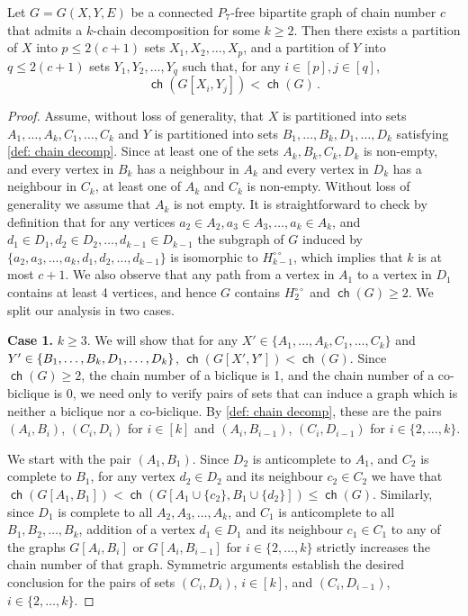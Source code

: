 \documentclass{article}
\newcommand\splitaftercomma[1]{%
  \begingroup
  \begingroup\lccode`~=`, \lowercase{\endgroup
    \edef~{\mathchar\the\mathcode`, \penalty0 \noexpand\hspace{0pt plus .25em}}%
  }\mathcode`,="8000 #1%
  \endgroup
}
\DeclareMathOperator\ch{\mathsf{ch}}
\begin{document}
\begin{lemma}
	\label{lemma: P7 decomp G}
	Let $G=G(X,Y,E)$ be a connected $P_7$-free bipartite graph of chain number $c$ that
	admits a $k$-chain decomposition for some $k \geq 2$. Then there exists 
	a partition of $X$ into $p \leq 2(c+1)$ sets $X_1, X_2, \ldots, X_p$, and
	a partition of $Y$ into $q \leq 2(c+1)$ sets $Y_1, Y_2, \ldots, Y_q$ such that, for any $i
  \in [p], j \in [q]$,
	\[
	\ch(G[X_i, Y_j]) <  \ch(G) \,.
	\]
\end{lemma}
\begin{proof}
	Assume, without loss of generality, that $X$ is partitioned into sets $A_1, \ldots, A_k, C_1, \ldots, C_k$ and $Y$ is partitioned into sets $B_1, \ldots, B_k, D_1, \ldots, D_k$ satisfying \cref{def: chain decomp}.
	Since at least one of the sets $A_k, B_k,C_k,D_k$ is non-empty, and
	every vertex in $B_k$ has a neighbour in $A_k$ and every vertex in $D_k$ has a neighbour in $C_k$,
	at least one of $A_k$ and $C_k$ is non-empty. Without loss of generality we assume that $A_k$ is not empty.
	It is straightforward to check by definition that for any vertices $a_2 \in A_2, a_3 \in A_3, \ldots, a_k \in A_k$,
	and $d_1 \in D_1, d_2 \in D_2, \ldots, d_{k-1} \in D_{k-1}$ the subgraph of $G$ induced by 
	$\{ a_2, a_3, \ldots, a_k, d_1, d_2, \ldots, d_{k-1} \}$ is isomorphic to $H^{\circ\circ}_{k-1}$, which implies that $k$ is at most $c+1$.
	We also observe that any path from a vertex in $A_1$ to a vertex in $D_1$
	contains at least 4 vertices, and hence $G$ contains $H^{\circ\circ}_2$ and 
	$\ch(G) \geq 2$. We split our analysis in two cases.
	
	\textbf{Case 1.} $k \geq 3$. We will show that for any 
	$X' \in \{ A_1, \ldots, A_k, C_1, \ldots, C_k \}$ and $Y' \in \{ B_1, \ldots, B_k\splitaftercomma{,} D_1, \ldots, D_k \}$,
	$\ch(G[X',Y']) < \ch(G)$. Since $\ch(G) \geq 2$, the chain number of a biclique is 1, and the chain number of a co-biclique is 0, we need only to verify pairs of sets that can induce a graph which is neither a biclique nor a co-biclique. By \cref{def: chain decomp}, these are the pairs 
	$(A_i, B_i)$, $(C_i, D_i)$  for $i \in [k]$ and $(A_i, B_{i-1})$, $(C_i, D_{i-1})$ for $i \in \{2, \ldots, k\}$. 
	
	We start with the pair $(A_1, B_1)$. Since $D_2$ is anticomplete to $A_1$, and $C_2$ is complete to $B_1$, for any vertex $d_2 \in D_2$ and its neighbour $c_2 \in C_2$ we have that $\ch(G[A_1,B_1]) < \ch(G[A_1 \cup \{ c_2 \}, B_1 \cup \{d_2\}]) \leq \ch(G)$. Similarly, since $D_1$ is complete to all $A_2, A_3, \ldots, A_k$, and $C_1$ is anticomplete to all $B_1, B_2, \ldots, B_k$, addition of a vertex $d_1 \in D_1$ and its neighbour $c_1 \in C_1$ to
	any of the graphs $G[A_i, B_i]$ or $G[A_i, B_{i-1}]$ for $i \in \{2, \ldots, k\}$ strictly increases the chain number of that graph. Symmetric arguments establish the desired conclusion for the pairs of sets
	$(C_i, D_i)$, $i \in [k]$, and $(C_i, D_{i-1})$, $i \in \{2, \ldots, k\}$.
	

\end{proof}
\end{document}
